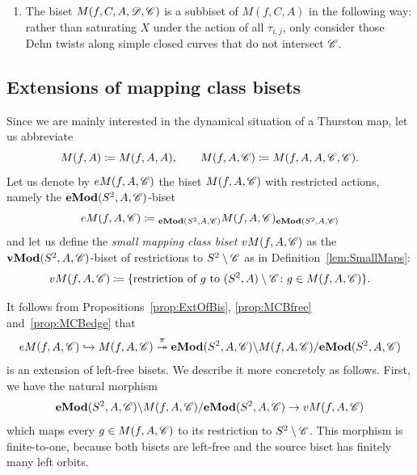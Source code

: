 \documentclass{amsart}
\begin{document}
\begin{algo}
\begin{enumerate}
    of $M(f,C,A)$ may be computed as follows. For each
    $m\in\Mod(S^2,A)$ and each $\Psi\in X$, let $\Psi'\in X$ be such
    that $\overline{\Psi'}=\overline{m\Psi}$. Write $h'_{i,j}$,
    respectively $h''_{i,j}$, for the products of entries along the
    cycles of $m\Psi,\Psi'$ respectively. Let $m'\colon H\selfmap$ be
    the automorphism of $H$ defined by $h'_{i,j}\mapsto h''_{i,j}$; it
    may e.g.\ be normalized by computing the images of the standard
    generators $\delta_k$. Then the biset $M(f,C,A)$ is defined by the
    equations $\Psi\cdot m=m'\cdot\Psi'$.
  \item The biset $M(f,C,A,\DD,\CC)$ is a subbiset of $M(f,C,A)$ in
    the following way: rather than saturating $X$ under the action of
    all $\tau_{i,j}$, only consider those Dehn twists along simple
    closed curves that do not intersect $\CC$.
  \end{enumerate}
\end{algo}

\subsection{Extensions of mapping class bisets}\label{ss:extensionsmcb}
Since we are mainly interested in the dynamical situation of a
Thurston map, let us abbreviate
\[M(f,A)\coloneqq M(f,A,A),\qquad M(f,A,\CC)\coloneqq M(f,A,A,\CC,\CC).
\]
Let us denote by $eM(f,A,\CC)$ the biset $M(f,A,\CC)$ with restricted
actions, namely the $\Mod[e](S^2,A,\CC)$-biset
\[eM(f,A,\CC)\coloneqq \subscript{\Mod[e](S^2,A,\CC)}M(f,A,\CC)_{\Mod[e](S^2,A,\CC)}
\]
and let us define the \emph{small mapping class biset} $vM(f,A,\CC)$
as the $\Mod[v](S^2,A,\CC)$-biset of restrictions to $S^2\setminus\CC$
as in Definition~\ref{lem:SmallMaps}:
\begin{equation}\label{eq:vB}
  vM(f,A,\CC)\coloneqq\{\text{restriction of } g \text{ to }(S^2,A)\setminus\CC\colon g\in M(f,A,\CC)\}.
\end{equation}

\noindent It follows from Propositions~\ref{prop:ExtOfBis},
\ref{prop:MCBfree} and~\ref{prop:MCBedge} that
\begin{equation}\label{eq:Mp_Cl_biset_seq}
  eM(f,A,\CC)\hookrightarrow M(f,A,\CC)
  \overset\pi\twoheadrightarrow \Mod[e](S^2,A,\CC)\backslash M(f,A,\CC)/\Mod[e](S^2,A,\CC)
\end{equation}
is an extension of left-free bisets. We describe it more concretely as
follows.  First, we have the natural morphism
\begin{equation}\label{eq:forgetvM}
  \Mod[e](S^2,A,\CC)\backslash M(f,A,\CC)/\Mod[e](S^2,A,\CC)\to vM(f,A,\CC)
\end{equation}
which maps every $g\in M(f,A,\CC)$ to its restriction to
$S^2\setminus\CC$.  This morphism is finite-to-one, because both
bisets are left-free and the source biset has finitely many left
orbits.
\end{document}
